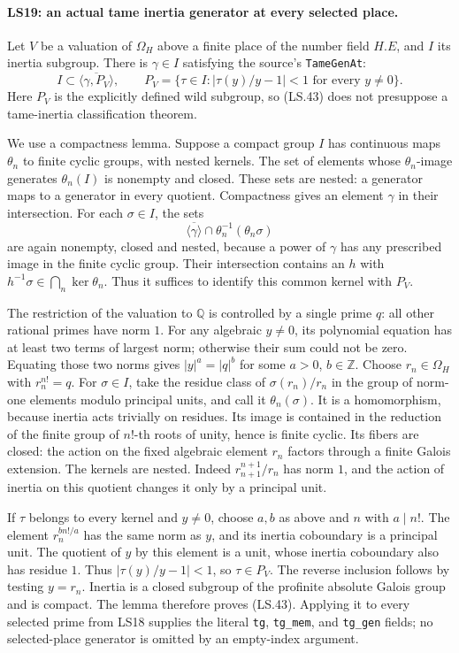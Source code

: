 \paragraph{LS19: an actual tame inertia generator at every selected place.}
Let $V$ be a valuation of $\Omega_H$ above a finite place of the
number field $H.E$, and $I$ its inertia subgroup. There is
$\gamma\in I$ satisfying the source's \texttt{TameGenAt}:
\[
 I\subset\overline{\langle\gamma,P_V\rangle},\qquad
 P_V=\{\tau\in I:|\tau(y)/y-1|<1\text{ for every }y\ne0\}.
                                                               \tag{LS.43}
\]
Here $P_V$ is the explicitly defined wild subgroup, so (LS.43)
does not presuppose a tame-inertia classification theorem.

We use a compactness lemma. Suppose a compact group $I$ has
continuous maps $\theta_n$ to finite cyclic groups, with nested
kernels. The set of elements whose $\theta_n$-image generates
$\theta_n(I)$ is nonempty and closed. These sets are nested:
a generator maps to a generator in every quotient.
Compactness gives an element $\gamma$ in their intersection.
For each $\sigma\in I$, the sets
\[
 \overline{\langle\gamma\rangle}\cap
                       \theta_n^{-1}(\theta_n\sigma)
\]
are again nonempty, closed and nested, because a power of
$\gamma$ has any prescribed image in the finite cyclic group.
Their intersection contains an $h$ with
$h^{-1}\sigma\in\bigcap_n\ker\theta_n$.
Thus it suffices to identify this common kernel with $P_V$.

The restriction of the valuation to $\mathbb Q$ is controlled
by a single prime $q$: all other rational primes have norm $1$.
For any algebraic $y\ne0$, its polynomial equation has at least
two terms of largest norm; otherwise their sum could not be zero.
Equating those two norms gives
$|y|^a=|q|^b$ for some $a>0$, $b\in\mathbb Z$.
Choose $r_n\in\Omega_H$ with $r_n^{n!}=q$.
For $\sigma\in I$, take the residue class of
$\sigma(r_n)/r_n$ in the group of norm-one elements modulo
principal units, and call it $\theta_n(\sigma)$.
It is a homomorphism, because inertia acts trivially on residues.
Its image is contained in the reduction of the finite group of
$n!$-th roots of unity, hence is finite cyclic. Its fibers are
closed: the action on the fixed algebraic element $r_n$ factors
through a finite Galois extension. The kernels are nested.
Indeed $r_{n+1}^{n+1}/r_n$ has norm $1$, and the action of
inertia on this quotient changes it only by a principal unit.

If $\tau$ belongs to every kernel and $y\ne0$, choose $a,b$
as above and $n$ with $a\mid n!$. The element
$r_n^{b n!/a}$ has the same norm as $y$, and its inertia
coboundary is a principal unit. The quotient of $y$ by this
element is a unit, whose inertia coboundary also has residue $1$.
Thus $|\tau(y)/y-1|<1$, so $\tau\in P_V$.
The reverse inclusion follows by testing $y=r_n$.
Inertia is a closed subgroup of the profinite absolute Galois
group and is compact. The lemma therefore proves (LS.43).
Applying it to every selected prime from LS18 supplies the
literal \texttt{tg}, \texttt{tg\_mem}, and \texttt{tg\_gen}
fields; no selected-place generator is omitted by an empty-index
argument.

